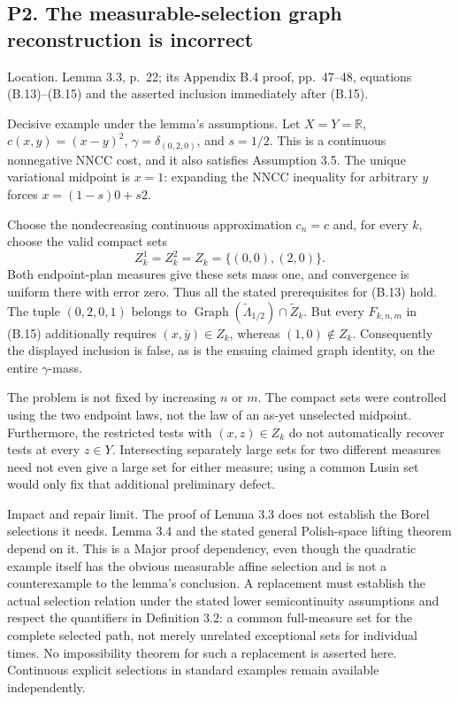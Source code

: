 \documentclass[10pt]{article}
\begin{document}
\subsection*{P2. The measurable-selection graph reconstruction is incorrect}
Location. Lemma 3.3, p. 22; its Appendix B.4 proof, pp. 47–48, equations (B.13)–(B.15) and the asserted inclusion immediately after (B.15).\par
Decisive example under the lemma’s assumptions. Let \(X=Y=\mathbb R\), \(c(x,y)=(x-y)^2\), \(\gamma=\delta_{(0,2,0)}\), and \(s=1/2\). This is a continuous nonnegative NNCC cost, and it also satisfies Assumption 3.5. The unique variational midpoint is \(x=1\): expanding the NNCC inequality for arbitrary \(y\) forces \(x=(1-s)0+s2\).\par
Choose the nondecreasing continuous approximation \(c_n=c\) and, for every \(k\), choose the valid compact sets \[Z_k^1=Z_k^2=Z_k=\{(0,0),(2,0)\}.\] Both endpoint-plan measures give these sets mass one, and convergence is uniform there with error zero. Thus all the stated prerequisites for (B.13) hold. The tuple \((0,2,0,1)\) belongs to \(\operatorname{Graph}(\widetilde\Lambda_{1/2})\cap\widetilde Z_k\). But every \(F_{k,n,m}\) in (B.15) additionally requires \((x,\bar y)\in Z_k\), whereas \((1,0)\notin Z_k\). Consequently the displayed inclusion is false, as is the ensuing claimed graph identity, on the entire \(\gamma\)-mass.\par
The problem is not fixed by increasing \(n\) or \(m\). The compact sets were controlled using the two endpoint laws, not the law of an as-yet unselected midpoint. Furthermore, the restricted tests with \((x,z)\in Z_k\) do not automatically recover tests at every \(z\in Y\). Intersecting separately large sets for two different measures need not even give a large set for either measure; using a common Lusin set would only fix that additional preliminary defect.\par
Impact and repair limit. The proof of Lemma 3.3 does not establish the Borel selections it needs. Lemma 3.4 and the stated general Polish-space lifting theorem depend on it. This is a Major proof dependency, even though the quadratic example itself has the obvious measurable affine selection and is not a counterexample to the lemma’s conclusion. A replacement must establish the actual selection relation under the stated lower semicontinuity assumptions and respect the quantifiers in Definition 3.2: a common full-measure set for the complete selected path, not merely unrelated exceptional sets for individual times. No impossibility theorem for such a replacement is asserted here. Continuous explicit selections in standard examples remain available independently.\par
\end{document}
